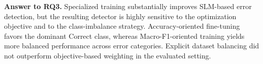 \textbf{Answer to RQ3.} Specialized training substantially improves SLM-based error detection, but the resulting detector is highly sensitive to the optimization objective and to the class-imbalance strategy. Accuracy-oriented fine-tuning favors the dominant Correct class, whereas Macro-F1-oriented training yields more balanced performance across error categories. Explicit dataset balancing did not outperform objective-based weighting in the evaluated setting.
